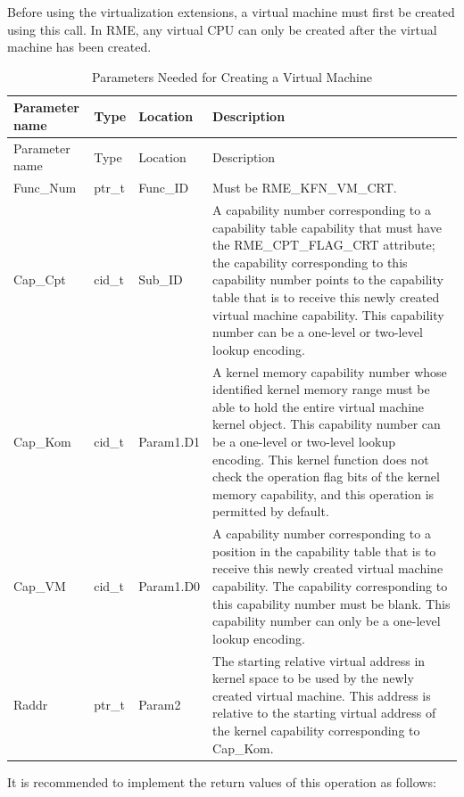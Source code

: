 Before using the virtualization extensions, a virtual machine must first be created using this call. In RME, any virtual CPU can only be created after the virtual machine has been created.

\begin{xltabular}{\textwidth}{@{}>{\hsize\raggedright\arraybackslash}X>{\hsize\raggedright\arraybackslash}X>{\hsize\raggedright\arraybackslash}X>{\hsize\raggedright\arraybackslash}X@{}}
\caption{Parameters Needed for Creating a Virtual Machine}\label{tab:8-73-create-virtual-machine-parameters}\\
\toprule
Parameter name & Type & Location & Description\tabularnewline
\endfirsthead
\toprule
Parameter name & Type & Location & Description\tabularnewline
\midrule
\endhead
\bottomrule
\endlastfoot
Func\_Num & ptr\_t & Func\_ID & Must be RME\_KFN\_VM\_CRT.\tabularnewline
Cap\_Cpt & cid\_t & Sub\_ID &
A capability number corresponding to a capability table capability that must have the RME\_CPT\_FLAG\_CRT attribute; the capability corresponding to this capability number points to the capability table that is to receive this newly created virtual machine capability. This capability number can be a one-level or two-level lookup encoding.\tabularnewline
Cap\_Kom & cid\_t & Param1.D1 &
A kernel memory capability number whose identified kernel memory range must be able to hold the entire virtual machine kernel object. This capability number can be a one-level or two-level lookup encoding. This kernel function does not check the operation flag bits of the kernel memory capability, and this operation is permitted by default.\tabularnewline
Cap\_VM & cid\_t & Param1.D0 &
A capability number corresponding to a position in the capability table that is to receive this newly created virtual machine capability. The capability corresponding to this capability number must be blank. This capability number can only be a one-level lookup encoding.\tabularnewline
Raddr & ptr\_t & Param2 &
The starting relative virtual address in kernel space to be used by the newly created virtual machine. This address is relative to the starting virtual address of the kernel capability corresponding to Cap\_Kom.\tabularnewline
\end{xltabular}
\nopagebreak[4]

It is recommended to implement the return values of this operation as follows:

